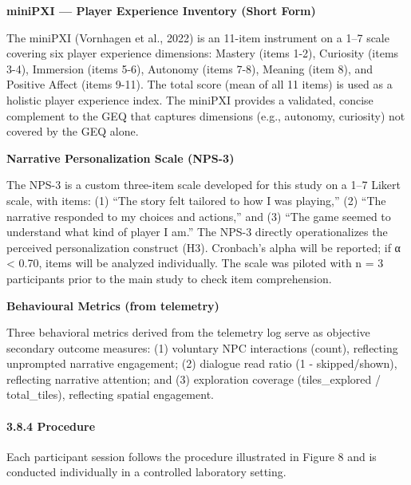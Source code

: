 \textbf{miniPXI --- Player Experience Inventory (Short Form)}

The miniPXI (Vornhagen et al., 2022) is an 11-item instrument on a 1--7
scale covering six player experience dimensions: Mastery (items 1-2),
Curiosity (items 3-4), Immersion (items 5-6), Autonomy (items 7-8),
Meaning (item 8), and Positive Affect (items 9-11). The total score
(mean of all 11 items) is used as a holistic player experience index.
The miniPXI provides a validated, concise complement to the GEQ that
captures dimensions (e.g., autonomy, curiosity) not covered by the GEQ
alone.

\textbf{Narrative Personalization Scale (NPS-3)}

The NPS-3 is a custom three-item scale developed for this study on a
1--7 Likert scale, with items: (1) ``The story felt tailored to how I
was playing,'' (2) ``The narrative responded to my choices and
actions,'' and (3) ``The game seemed to understand what kind of player I
am.'' The NPS-3 directly operationalizes the perceived personalization
construct (H3). Cronbach's alpha will be reported; if α \textless{}
0.70, items will be analyzed individually. The scale was piloted with n
= 3 participants prior to the main study to check item comprehension.

\textbf{Behavioural Metrics (from telemetry)}

Three behavioral metrics derived from the telemetry log serve as
objective secondary outcome measures: (1) voluntary NPC interactions
(count), reflecting unprompted narrative engagement; (2) dialogue read
ratio (1 - skipped/shown), reflecting narrative attention; and (3)
exploration coverage (tiles\_explored / total\_tiles), reflecting
spatial engagement.

\paragraph{3.8.4 Procedure}\label{procedure}

Each participant session follows the procedure illustrated in Figure 8
and is conducted individually in a controlled laboratory setting.

